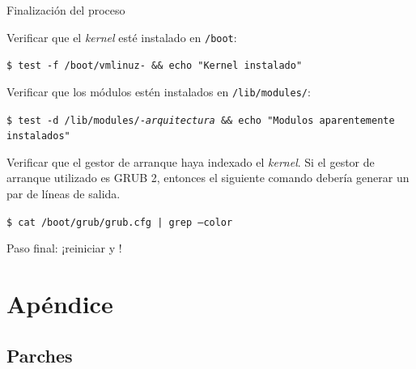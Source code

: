 \begin{frame}{Finalización del proceso}

Verificar que el \textit{kernel} esté instalado en \texttt{/boot}:

{ \tiny
  \begin{block}{}
    \texttt{\$ test -f /boot/vmlinuz-\KERNELBASEVERSION\ \&\& echo "Kernel instalado"}
\end{block} }

Verificar que los módulos estén instalados en
\texttt{/lib/modules/\KERNELBASEVERSION}:

{ \tiny
  \begin{block}{}
    \texttt{\$ test -d /lib/modules/\KERNELBASEVERSION-\textit{arquitectura}
      \&\& echo "Modulos aparentemente instalados"}
\end{block} }

Verificar que el gestor de arranque haya indexado el \textit{kernel}. Si el
gestor de arranque utilizado es GRUB 2, entonces el siguiente comando
debería generar un par de líneas de salida.

  { \tiny
  \begin{block}{}
    \texttt{\$ cat /boot/grub/grub.cfg  | grep --color \KERNELBASEVERSION}
\end{block} }

Paso final: ¡\alert{reiniciar} y !
\end{frame}

\section{Apéndice}
\subsection{Parches}

